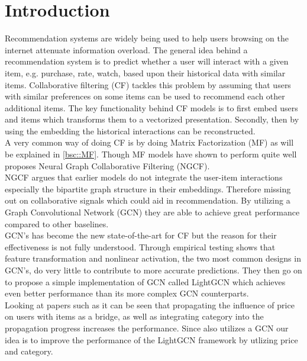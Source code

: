 \section{Introduction}
Recommendation systems are widely being used to help users browsing on the internet attenuate information overload\cite{YT_rec,Pint_rec}.
The general idea behind a recommendation system is to predict whether a user will interact with a given item, e.g. purchase, rate, watch, based upon their historical data with similar items.
Collaborative filtering (CF) tackles this problem by assuming that users with similar preferences on some items can be used to recommend each other additional items.
The key functionality behind CF models is to first embed users and items which transforms them to a vectorized presentation.
Secondly, then by using the embedding the historical interactions can be reconstructed.
\\
A very common way of doing CF is by doing Matrix Factorization (MF) as will be explained in \autoref{bsc::MF}.
Though MF models have shown to perform quite well \cite{NGCF_2019} proposes Neural Graph Collaborative Filtering (NGCF).
\\ 
NGCF argues that earlier models do not integrate the user-item interactions especially the bipartite graph structure in their embeddings.
Therefore missing out on collaborative signals which could aid in recommendation.
By utilizing a Graph Convolutional Network (GCN) they are able to achieve great performance compared to other baselines.
\\
GCN's has become the new state-of-the-art for CF but the reason for their effectiveness is not fully understood\cite{lightgcn}.
Through empirical testing \cite{lightgcn} shows that feature transformation and nonlinear activation, the two most common designs in GCN's, do very little to contribute to more accurate predictions.
They then go on to propose a simple implementation of GCN called LightGCN which achieves even better performance than its more complex GCN counterparts.
\\
Looking at papers such as \cite{Priceaware} it can be seen that propagating the influence of price on users with items as a bridge, as well as integrating category into the propagation progress increases the performance.
Since \cite{Priceaware} also utilizes a GCN our idea is to improve the performance of the LightGCN framework by utlizing price and category.
